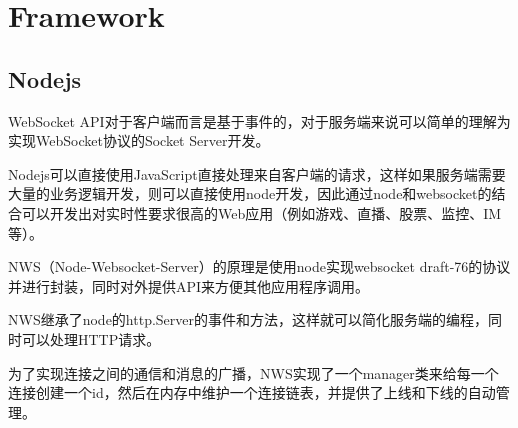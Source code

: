 \begin{lstlisting}[language=PHP]

\end{lstlisting}




\begin{lstlisting}[language=PHP]

\end{lstlisting}



\begin{lstlisting}[language=PHP]

\end{lstlisting}



\begin{lstlisting}[language=PHP]

\end{lstlisting}




\begin{lstlisting}[language=PHP]

\end{lstlisting}




\chapter{Framework}


\section{Nodejs}

WebSocket API对于客户端而言是基于事件的，对于服务端来说可以简单的理解为实现WebSocket协议的Socket Server开发。


Nodejs可以直接使用JavaScript直接处理来自客户端的请求，这样如果服务端需要大量的业务逻辑开发，则可以直接使用node开发，因此通过node和websocket的结合可以开发出对实时性要求很高的Web应用（例如游戏、直播、股票、监控、IM等）。

NWS（Node-Websocket-Server）的原理是使用node实现websocket draft-76的协议并进行封装，同时对外提供API来方便其他应用程序调用。

NWS继承了node的http.Server的事件和方法，这样就可以简化服务端的编程，同时可以处理HTTP请求。

为了实现连接之间的通信和消息的广播，NWS实现了一个manager类来给每一个连接创建一个id，然后在内存中维护一个连接链表，并提供了上线和下线的自动管理。

